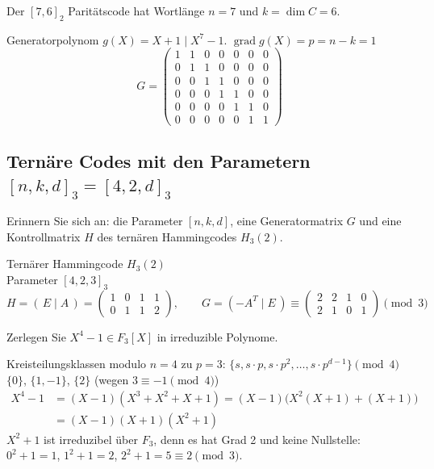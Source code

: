 \begin{loesung}
Der $[7, 6]_2$ Paritätscode hat Wortlänge $n = 7$ und $k = \dim C = 6$.

Generatorpolynom $g(X) = X + 1 \mid X^7 - 1$. \quad $\operatorname{grad} g(X) = p = n - k = 1$
\[
G = \begin{pmatrix}
1 & 1 & 0 & 0 & 0 & 0 & 0\\
0 & 1 & 1 & 0 & 0 & 0 & 0\\
0 & 0 & 1 & 1 & 0 & 0 & 0\\
0 & 0 & 0 & 1 & 1 & 0 & 0\\
0 & 0 & 0 & 0 & 1 & 1 & 0\\
0 & 0 & 0 & 0 & 0 & 1 & 1
\end{pmatrix}
\]
\end{loesung}

\subsection{Ternäre Codes mit den Parametern $[n, k, d]_3 = [4, 2, d]_3$}

\begin{aufgabe}[6\_4]
Erinnern Sie sich an: die Parameter $[n, k, d]$, eine Generatormatrix $G$ und eine Kontrollmatrix $H$ des ternären Hammingcodes $H_3(2)$.
\end{aufgabe}

\begin{loesung}
Ternärer Hammingcode $H_3(2)$\\
Parameter $[4, 2, 3]_3$
\[
H = (\, E \mid A \,) = \begin{pmatrix} 1 & 0 & 1 & 1\\ 0 & 1 & 1 & 2 \end{pmatrix}, \qquad
G = (-A^T \mid E\,) \equiv \begin{pmatrix} 2 & 2 & 1 & 0\\ 2 & 1 & 0 & 1 \end{pmatrix} \pmod{3}
\]
\end{loesung}

\begin{aufgabe}[6\_5]
Zerlegen Sie $X^4 - 1 \in F_3[X]$ in irreduzible Polynome.
\end{aufgabe}

\begin{loesung}
Kreisteilungsklassen modulo $n = 4$ zu $p = 3$: $\{s, s \cdot p, s \cdot p^2, \dots, s \cdot p^{d-1}\} \pmod{4}$\\
$\{0\}$, $\{1, -1\}$, $\{2\}$ \quad (wegen $3 \equiv -1 \pmod{4}$)
\begin{align*}
X^4 - 1 &= (X - 1)(X^3 + X^2 + X + 1) = (X - 1)\bigl(X^2(X + 1) + (X + 1)\bigr)\\
        &= (X - 1)(X + 1)(X^2 + 1)
\end{align*}
$X^2 + 1$ ist irreduzibel über $F_3$, denn es hat Grad 2 und keine Nullstelle: $0^2 + 1 = 1$, $1^2 + 1 = 2$, $2^2 + 1 = 5 \equiv 2 \pmod{3}$.
\end{loesung}

